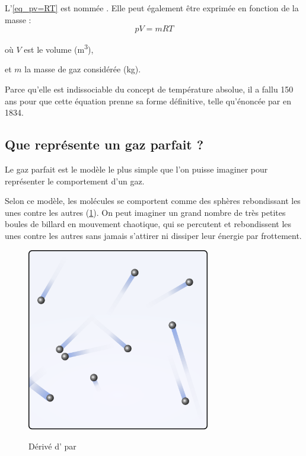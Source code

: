 		L’\cref{eq_pv=RT} est nommée . Elle peut également être exprimée en fonction de la masse :
		\begin{equation}
			p V = m R T
			\label{eq_pV=mRT}
		\end{equation}
		
		\begin{equationterms}
			\item où \tab $V$ \tab est le volume (\si{\metre\cubed}),
			\item et \tab $m$ \tab la masse de gaz considérée (\si{\kilogram}).
		\end{equationterms}

		Parce qu’elle est indissociable du concept de température absolue, il a fallu 150 ans pour que cette équation prenne sa forme définitive, telle qu’énoncée par  en 1834.


	\subsection{Que représente un gaz parfait ?}
	\label{ch_gaz_parfait_kezako}

		Le gaz parfait est le modèle le plus simple que l’on puisse imaginer pour représenter le comportement d’un gaz.
		
		Selon ce modèle, les molécules se comportent comme des sphères rebondissant les unes contre les autres (\cref{fig_gaz_boules}). On peut imaginer un grand nombre de très petites boules de billard en mouvement chaotique, qui se percutent et rebondissent les unes contre les autres sans jamais s’attirer ni dissiper leur énergie par frottement.
		
		\begin{figure}
			\begin{center}
				\includegraphics[width=8cm]{images/gaz_boules.png}
			\end{center}
			{Dérivé d’ \ccbysa par }
			\label{fig_gaz_boules}
		\end{figure}
		
